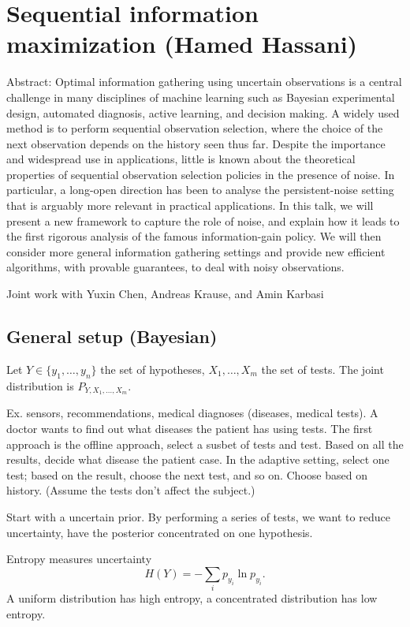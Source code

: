 \section{Sequential information maximization (Hamed Hassani)}

Abstract: Optimal information gathering using uncertain observations is a central challenge in many disciplines of machine learning such as Bayesian experimental design, automated diagnosis, active learning, and decision making. A widely used method is to perform sequential observation selection, where the choice of the next observation depends on the history seen thus far. Despite the importance and widespread use in applications, little is known about the theoretical properties of sequential observation selection policies in the presence of noise. In particular, a long-open direction has been to analyse the persistent-noise setting that is arguably more relevant in practical applications. In this talk, we will present a new framework to capture the role of noise, and explain how it leads to the first rigorous analysis of the famous information-gain policy. We will then consider more general information gathering settings and provide new efficient algorithms, with provable guarantees,  to deal with noisy observations.

Joint work with Yuxin Chen, Andreas Krause, and Amin Karbasi

\subsection{General setup (Bayesian)}

Let $Y\in \{y_1,\ldots, y_n\}$ the set of hypotheses, $X_1,\ldots, X_m$ the set of tests. The joint distribution is $P_{Y, X_1,\ldots, X_m}$. 

Ex. sensors, recommendations, medical diagnoses (diseases, medical tests).
A doctor wants to find out what diseases the patient has using tests. The first approach is the offline approach, select a susbet of tests and test. Based on all the results, decide what disease the patient case. In the adaptive setting, select one test; based on the result, choose the next test, and so on. Choose based on history. (Assume the tests don't affect the subject.)

Start with a uncertain prior. By performing a series of tests, we want to reduce uncertainty, have the posterior concentrated on one hypothesis. %

Entropy measures uncertainty
$$
H(Y) = -\sum_i p_{y_i} \ln p_{y_i}.
$$
A uniform distribution has high entropy, a concentrated distribution has low entropy.




